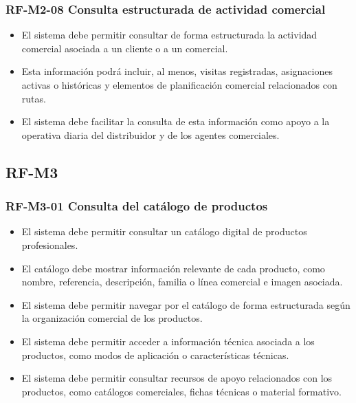 \vspace{-0.75em}
\subsubsection{RF-M2-08 Consulta estructurada de actividad comercial}
\vspace{-1em}

\begin{itemize}
    \item El sistema debe permitir consultar de forma estructurada la actividad comercial asociada a un cliente o a un comercial.
    \item Esta información podrá incluir, al menos, visitas registradas, asignaciones activas o históricas y elementos de planificación comercial relacionados con rutas.
    \item El sistema debe facilitar la consulta de esta información como apoyo a la operativa diaria del distribuidor y de los agentes comerciales.
\end{itemize}

\subsection{RF-M3}

\vspace{-0.75em}
\subsubsection{RF-M3-01 Consulta del catálogo de productos}
\vspace{-1em}

\begin{itemize}
    \item El sistema debe permitir consultar un catálogo digital de productos profesionales.
    \item El catálogo debe mostrar información relevante de cada producto, como nombre, referencia, descripción, familia o línea comercial e imagen asociada.
    \item El sistema debe permitir navegar por el catálogo de forma estructurada según la organización comercial de los productos.
    \item El sistema debe permitir acceder a información técnica asociada a los productos, como modos de aplicación o características técnicas.
    \item El sistema debe permitir consultar recursos de apoyo relacionados con los productos, como catálogos comerciales, fichas técnicas o material formativo.
\end{itemize}


